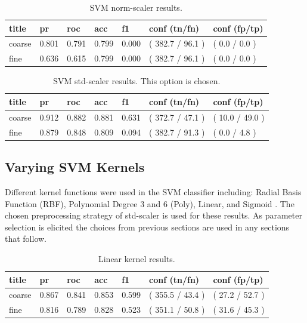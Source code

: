 \documentclass[ms]{nuthesis}
\begin{document}
\FloatBarrier
\begin{table}[H]
\centering
\caption{SVM norm-scaler results.}
\label{tab:SVMNorm}
\begin{tabular}{|l||l||l||l||l||l||l|}\toprule
title & pr & roc & acc & f1 & conf (tn/fn) & conf (fp/tp) \\ \midrule
coarse & 0.801 & 0.791 & 0.799 & 0.000 & ( 382.7 / 96.1 ) & ( 0.0 / 0.0 ) \\
fine & 0.636 & 0.615 & 0.799 & 0.000 & ( 382.7 / 96.1 ) & ( 0.0 / 0.0 ) \\ \bottomrule
\end{tabular}
\end{table}
\FloatBarrier

\FloatBarrier
\begin{table}[H]
\centering
\caption{SVM std-scaler results. This option is chosen.}
\label{tab:SVMStandard}
\begin{tabular}{|l||l||l||l||l||l||l|}\toprule
title & pr & roc & acc & f1 & conf (tn/fn) & conf (fp/tp) \\ \midrule
coarse & 0.912 & 0.882 & 0.881 & 0.631 & ( 372.7 / 47.1 ) & ( 10.0 / 49.0 ) \\
fine & 0.879 & 0.848 & 0.809 & 0.094 & ( 382.7 / 91.3 ) & ( 0.0 / 4.8 ) \\ \bottomrule
\end{tabular}
\end{table}
\FloatBarrier


\subsection{Varying SVM Kernels}
\par Different kernel functions were used in the SVM classifier including: Radial Basis Function (RBF), Polynomial
Degree 3 and 6 (Poly), Linear, and Sigmoid \cite{scikit-learn}. The chosen preprocessing strategy of
std-scaler is used for these results. As parameter selection is elicited the choices from previous sections
are used in any sections that follow.



\FloatBarrier
\begin{table}[H]
\centering
\caption{Linear kernel results.}
\label{tab:Linear}
\begin{tabular}{|l||l||l||l||l||l||l|}\toprule
title & pr & roc & acc & f1 & conf (tn/fn) & conf (fp/tp) \\ \midrule
coarse & 0.867 & 0.841 & 0.853 & 0.599 & ( 355.5 / 43.4 ) & ( 27.2 / 52.7 ) \\
fine & 0.816 & 0.789 & 0.828 & 0.523 & ( 351.1 / 50.8 ) & ( 31.6 / 45.3 ) \\ \bottomrule
\end{tabular}
\end{table}
\FloatBarrier
\end{document}

